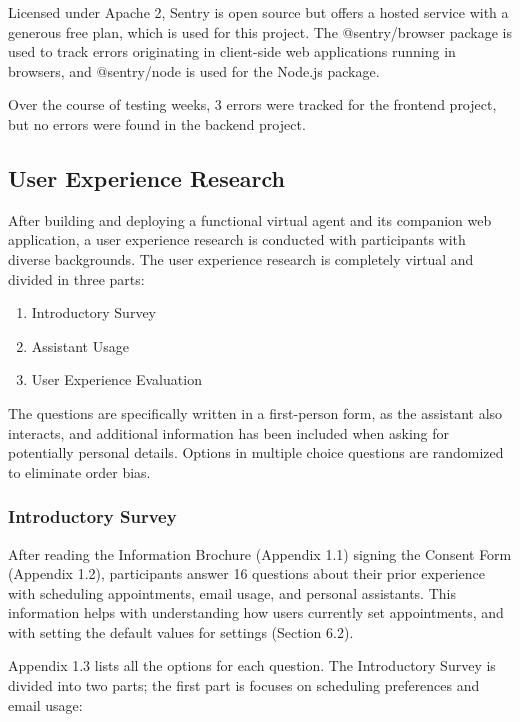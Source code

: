 \documentclass{article}
\begin{document}
Licensed under Apache 2, Sentry is open source but offers a hosted service with a generous free plan, which is used for this project. The @sentry/browser package is used to track errors originating in client-side web applications running in browsers, and @sentry/node is used for the Node.js package.

Over the course of testing weeks, 3 errors were tracked for the frontend project, but no errors were found in the backend project.

\subsection{User Experience Research}

After building and deploying a functional virtual agent and its companion web application, a user experience research is conducted with participants with diverse backgrounds. The user experience research is completely virtual and divided in three parts:

\begin{enumerate}
	\item Introductory Survey
	\item Assistant Usage
	\item User Experience Evaluation
\end{enumerate}

The questions are specifically written in a first-person form, as the assistant also interacts, and additional information has been included when asking for potentially personal details. Options in multiple choice questions are randomized to eliminate order bias.

\subsubsection{Introductory Survey}

After reading the Information Brochure (Appendix 1.1) signing the Consent Form (Appendix 1.2), participants answer 16 questions about their prior experience with scheduling appointments, email usage, and personal assistants. This information helps with understanding how users currently set appointments, and with setting the default values for settings (Section 6.2).

Appendix 1.3 lists all the options for each question. The Introductory Survey is divided into two parts; the first part is focuses on scheduling preferences and email usage:
\end{document}
